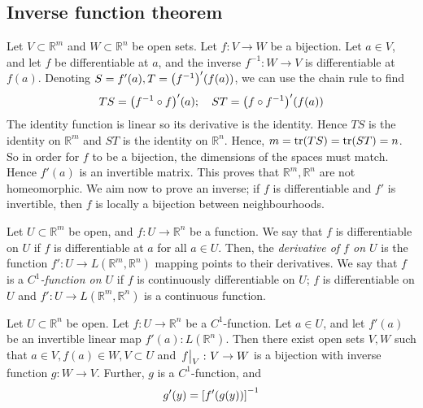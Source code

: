 \subsection{Inverse function theorem}
\begin{remark}
	Let \( V \subset \mathbb R^m \) and \( W \subset \mathbb R^n \) be open sets.
	Let \( f \colon V \to W \) be a bijection.
	Let \( a \in V \), and let \( f \) be differentiable at \( a \), and the inverse \( f^{-1} \colon W \to V \) is differentiable at \( f(a) \).
	Denoting \( S = f'(a), T = \qty(f^{-1})'(f(a)) \), we can use the chain rule to find
	\[
		TS = \qty(f^{-1} \circ f)'(a);\quad ST = \qty(f \circ f^{-1})'(f(a))
	\]
	The identity function is linear so its derivative is the identity.
	Hence \( TS \) is the identity on \( \mathbb R^m \) and \( ST \) is the identity on \( \mathbb R^n \).
	Hence, \( m = \tr(TS) = \tr(ST) = n \).
	So in order for \( f \) to be a bijection, the dimensions of the spaces must match.
	Hence \( f'(a) \) is an invertible matrix.
	This proves that \( \mathbb R^m, \mathbb R^n \) are not homeomorphic.
	We aim now to prove an inverse; if \( f \) is differentiable and \( f' \) is invertible, then \( f \) is locally a bijection between neighbourhoods.
\end{remark}
\begin{definition}
	Let \( U \subset \mathbb R^m \) be open, and \( f \colon U \to \mathbb R^n \) be a function.
	We say that \( f \) is differentiable on \( U \) if \( f \) is differentiable at \( a \) for all \( a \in U \).
	Then, the \textit{derivative of \( f \) on \( U \)} is the function \( f' \colon U \to L(\mathbb R^m, \mathbb R^n) \) mapping points to their derivatives.
	We say that \( f \) is a \textit{\( C^1 \)-function on \( U \)} if \( f \) is continuously differentiable on \( U \); \( f \) is differentiable on \( U \) and \( f' \colon U \to L(\mathbb R^m, \mathbb R^n) \) is a continuous function.
\end{definition}
\begin{theorem}
	Let \( U \subset \mathbb R^n \) be open.
	Let \( f \colon U \to \mathbb R^n \) be a \( C^1 \)-function.
	Let \( a \in U \), and let \( f'(a) \) be an invertible linear map \( f'(a) \colon L(\mathbb R^n) \).
	Then there exist open sets \( V, W \) such that \( a \in V, f(a) \in W, V \subset U \) and \( \eval{f}_V \colon V \to W \) is a bijection with inverse function \( g\colon W \to V \).
	Further, \( g \) is a \( C^1 \)-function, and
	\[
		g'(y) = \qty[f'(g(y))]^{-1}
	\]
\end{theorem}
